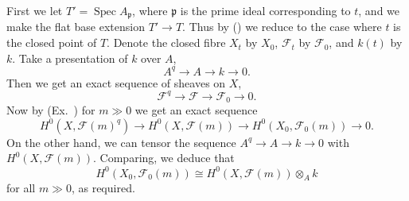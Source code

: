 {First we let $T'=\operatorname{Spec} A_{\mathfrak p}$, where $\mathfrak p$ is the prime ideal corresponding to $t$, and we make the flat base extension $T'\to T$. Thus by () we reduce to the case where $t$ is the closed point of $T$. Denote the closed fibre $X_t$ by $X_0$, $\mathcal F_t$ by $\mathcal F_0$, and $k(t)$ by $k$. Take a presentation of $k$ over $A$,
\[
A^q\longrightarrow A\longrightarrow k\longrightarrow0.
\]
Then we get an exact sequence of sheaves on $X$,
\[
\mathcal F^q\longrightarrow\mathcal F\longrightarrow\mathcal F_0\longrightarrow0.
\]
Now by (Ex.~) for $m\gg0$ we get an exact sequence
\[
H^0(X,\mathcal F(m)^q)\longrightarrow H^0(X,\mathcal F(m))\longrightarrow H^0(X_0,\mathcal F_0(m))\longrightarrow0.
\]
On the other hand, we can tensor the sequence $A^q\to A\to k\to0$ with $H^0(X,\mathcal F(m))$. Comparing, we deduce that
\[
H^0(X_0,\mathcal F_0(m))\cong H^0(X,\mathcal F(m))\otimes_A k
\]
for all $m\gg0$, as required.}
